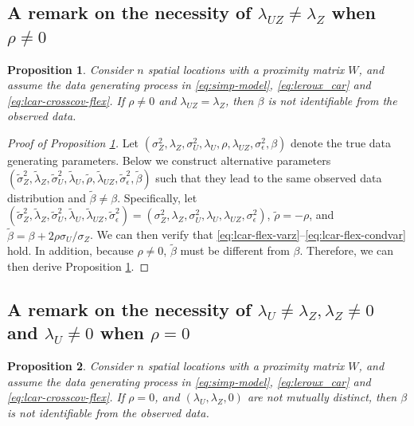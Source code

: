 \documentclass[11pt]{article}
\newtheorem{proposition}{Proposition}
\theoremstyle{definition}
\theoremstyle{remark}
\begin{document}
\subsection{A remark on the necessity of $\lambda_{UZ} \neq \lambda_Z$ when $\rho\neq 0$} 

\begin{proposition}\label{prop:nonid-lambdaUZ-lambdaZ}
Consider $n$ spatial locations with a proximity matrix $W$, and assume the data generating process in \eqref{eq:simp-model}, \eqref{eq:leroux_car} and \eqref{eq:lcar-crosscov-flex}. 
If $\rho\neq 0$ and $\lambda_{UZ}=\lambda_Z$, then $\beta$ is not identifiable from the observed data.
\end{proposition}

\begin{proof}[Proof of Proposition \ref{prop:nonid-lambdaUZ-lambdaZ}]
Let $(\sigma_Z^2, \lambda_Z, \sigma_U^2, \lambda_U, \rho, \lambda_{UZ}, \sigma_\epsilon^2, \beta)$ denote the true data generating parameters. 
Below we construct alternative parameters $(\tilde\sigma_Z^2, \tilde\lambda_Z, \tilde\sigma_U^2, \tilde\lambda_U, \tilde\rho, \tilde\lambda_{UZ}, \tilde\sigma_\epsilon^2, \tilde\beta)$ such that they lead to the same observed data distribution and $\tilde\beta \ne \beta$. 
Specifically, let $(\tilde\sigma_Z^2, \tilde\lambda_Z, \tilde\sigma_U^2, \tilde\lambda_U, \tilde\lambda_{UZ}, \tilde{\sigma}_\epsilon^2) = (\sigma_Z^2, \lambda_Z, \sigma_U^2, \lambda_U, \lambda_{UZ}, \sigma_\epsilon^2)$, $\tilde\rho= -\rho$,  and $\tilde\beta = \beta + 2\rho \sigma_U/\sigma_Z$. 
We can then verify that \eqref{eq:lcar-flex-varz}--\eqref{eq:lcar-flex-condvar} hold. 
In addition, because $\rho \ne 0$, $\tilde \beta$ must be different from $\beta$. 
Therefore, we can then derive Proposition \ref{prop:nonid-lambdaUZ-lambdaZ}. 
\end{proof}


\subsection{A remark on the necessity of $\lambda_U\neq \lambda_Z, \lambda_Z \neq 0$ and $\lambda_U \neq 0$ when $\rho = 0$} 

\begin{proposition}\label{prop:nonid-lcar_rho0}
Consider $n$ spatial locations with a proximity matrix $W$, and assume the data generating process in \eqref{eq:simp-model}, \eqref{eq:leroux_car} and \eqref{eq:lcar-crosscov-flex}. 
If $\rho = 0$, and $(\lambda_U, \lambda_Z, 0)$ are not mutually distinct, then $\beta$ is not identifiable from the observed data.
\end{proposition}
\end{document}
